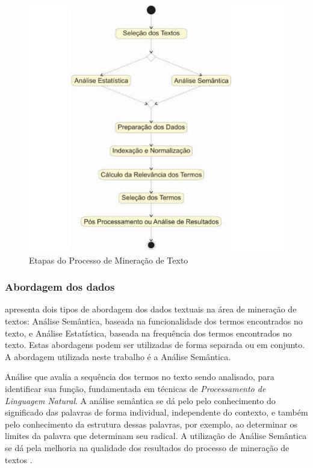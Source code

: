 \begin{figure}[H] %
	\caption{\label{fig:figura-2} Etapas do Processo de Mineração de Texto}
	\begin{center}
	    \includegraphics[scale=0.8]{figuras/figura_2.PNG} %
	\end{center}
\end{figure}

\subsubsection{Abordagem dos dados}
\cite{morais2007mineraccao} apresenta dois tipos de abordagem dos dados textuais na área de mineração de textos: Análise Semântica, baseada na funcionalidade dos termos encontrados no texto, e Análise Estatística, baseada na frequência dos termos encontrados no texto. Estas abordagens podem ser utilizadas de forma separada ou em conjunto. A abordagem utilizada neste trabalho é a Análise Semântica.

Análise que avalia a sequência dos termos no texto sendo analisado, para identificar sua função, fundamentada em técnicas de \textit{Processamento de Linguagem Natural}. A análise semântica se dá pelo pelo conhecimento do significado das palavras de forma individual, independente do contexto, e também pelo conhecimento da estrutura dessas palavras, por exemplo, ao determinar os limites da palavra que determinam seu radical. A utilização de Análise Semântica se dá pela melhoria na qualidade dos resultados do processo de mineração de textos \cite{morais2007mineraccao}. 

